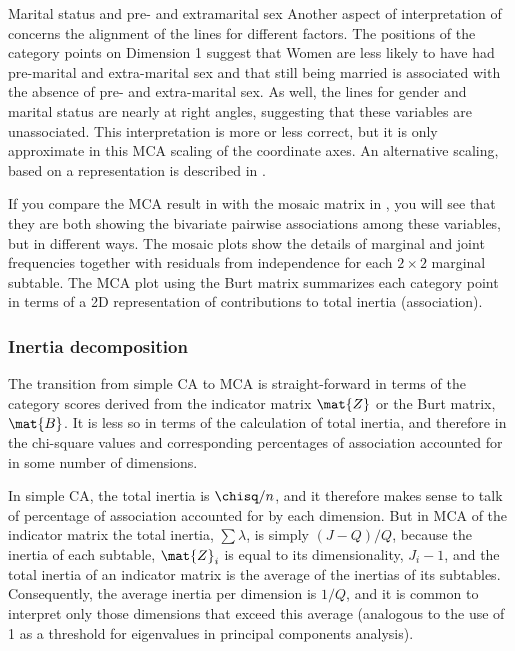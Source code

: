 \documentclass[11pt]{book}
\begin{document}
\begin{Example}[marital3]{Marital status and pre- and extramarital sex}
Another aspect of interpretation of  concerns the alignment
of the lines for different factors. 
The positions of the category points on Dimension 1 suggest that Women
are less likely to have had pre-marital and extra-marital sex
and that still being married is associated with the absence of pre- and extra-marital sex.
As well, the lines for gender and marital status are nearly at right
angles, suggesting that these variables are unassociated.
This interpretation is more or less correct, but it is only approximate in this
MCA scaling of the coordinate axes.  An alternative scaling, based on a
 representation is described in .

If you compare the MCA result in  with the
mosaic matrix in , you will see that they
are both showing the bivariate pairwise associations among these variables,
but in different ways. The mosaic plots show the details of marginal
and joint frequencies together with residuals from independence for
each $2 \times 2$ marginal subtable.  The MCA plot using the Burt matrix
summarizes each category point in terms of a 2D representation of
contributions to total inertia (association).
\end{Example}

\subsubsection{Inertia decomposition}

The transition from simple CA to MCA is straight-forward in terms of
the category scores derived from the indicator matrix $\mat{Z}$ or
the Burt matrix, $\mat{B}$.  It is less so in terms of the
calculation of total inertia,
and therefore in the chi-square values and corresponding percentages
of association accounted for in some number of dimensions.

In simple CA, the total inertia is $\chisq /n$, and it therefore
makes sense to talk of percentage of association accounted for
by each dimension.
But in MCA of the indicator matrix
the total inertia, $\sum \lambda$,
is simply $(J - Q)/Q$, because the inertia
of each subtable, $\mat{Z}_i$ is equal to its dimensionality,
$J_i - 1$, and the total inertia of an indicator matrix is
the average of the inertias of its subtables.
Consequently, the average inertia per dimension is $1/Q$,
and it is common to interpret only those dimensions that
exceed this average (analogous to the use of 1 as a threshold for
eigenvalues in principal components analysis).
\end{document}
